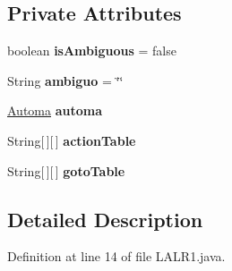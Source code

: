 \subsection*{Private Attributes}
\begin{DoxyCompactItemize}
\item 
\hypertarget{classcontext_free_1_1parser_1_1_l_a_l_r1_a3e69dd16d8b89cc9a210286efe0aa0d8}{boolean {\bfseries is\-Ambiguous} = false}\label{classcontext_free_1_1parser_1_1_l_a_l_r1_a3e69dd16d8b89cc9a210286efe0aa0d8}

\item 
\hypertarget{classcontext_free_1_1parser_1_1_l_a_l_r1_ac76b78ae26e1f59674ae10b9c1059213}{String {\bfseries ambiguo} = \char`\"{}\char`\"{}}\label{classcontext_free_1_1parser_1_1_l_a_l_r1_ac76b78ae26e1f59674ae10b9c1059213}

\item 
\hypertarget{classcontext_free_1_1parser_1_1_l_a_l_r1_ab6054628eaec08e8b3b77a37e219ef02}{\hyperlink{classcontext_free_1_1parser_1_1_automa}{Automa} {\bfseries automa}}\label{classcontext_free_1_1parser_1_1_l_a_l_r1_ab6054628eaec08e8b3b77a37e219ef02}

\item 
\hypertarget{classcontext_free_1_1parser_1_1_l_a_l_r1_a50a59810900d20102a28766aad917b79}{String\mbox{[}$\,$\mbox{]}\mbox{[}$\,$\mbox{]} {\bfseries action\-Table}}\label{classcontext_free_1_1parser_1_1_l_a_l_r1_a50a59810900d20102a28766aad917b79}

\item 
\hypertarget{classcontext_free_1_1parser_1_1_l_a_l_r1_a6f27da8ba10ef81be36845b0fffc9858}{String\mbox{[}$\,$\mbox{]}\mbox{[}$\,$\mbox{]} {\bfseries goto\-Table}}\label{classcontext_free_1_1parser_1_1_l_a_l_r1_a6f27da8ba10ef81be36845b0fffc9858}

\end{DoxyCompactItemize}


\subsection{Detailed Description}


Definition at line 14 of file L\-A\-L\-R1.\-java.



